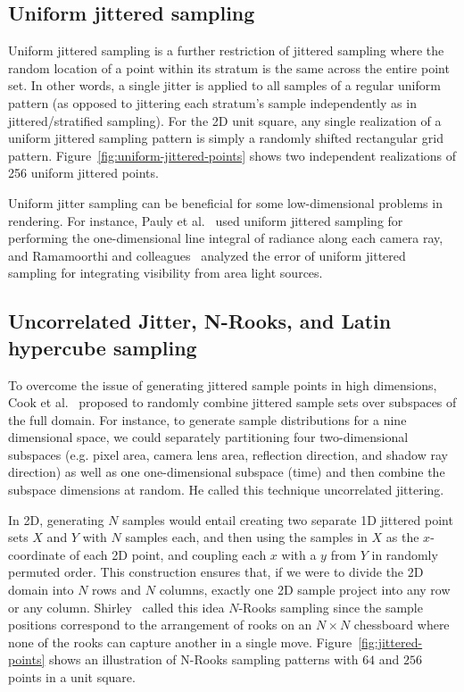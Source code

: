 \documentclass[11pt,fleqn]{book} %
\begin{document}
%

%

\subsection{Uniform jittered sampling}
Uniform jittered sampling is a further restriction of jittered sampling where the random location of a point within its stratum is the same across the entire point set. In other words, a single jitter is applied to all samples of a regular uniform pattern (as opposed to jittering each stratum's sample independently as in jittered/stratified sampling). For the 2D unit square, any single realization of a uniform jittered sampling pattern is simply a randomly shifted rectangular grid pattern. Figure~\ref{fig:uniform-jittered-points} shows two independent realizations of 256 uniform jittered points.

Uniform jitter sampling can be beneficial for some low-dimensional problems in rendering. For instance, Pauly et al.~\cite{pauly00metropolis} used uniform jittered sampling for performing the one-dimensional line integral of radiance along each camera ray, and Ramamoorthi and colleagues~\cite{Ramamoorthi:2012} analyzed the error of uniform jittered sampling for integrating visibility from area light sources.



\subsection{Uncorrelated Jitter, N-Rooks, and Latin hypercube sampling}
%
%
%
To overcome the issue of generating jittered sample points in high dimensions, Cook et al.~\cite{Cook:1984:DRT} proposed to randomly combine jittered sample sets over subspaces of the full domain. For instance, to generate sample distributions for a nine dimensional space, we could separately partitioning four two-dimensional subspaces (e.g. pixel area, camera lens area, reflection direction, and shadow ray direction) as well as one one-dimensional subspace (time) and then combine the subspace dimensions at random. He called this technique uncorrelated jittering.

In 2D, generating $N$ samples would entail creating two separate 1D jittered point sets $X$ and $Y$ with $N$ samples each, and then using the samples in $X$ as the $x$-coordinate of each 2D point, and coupling each $x$ with a $y$ from $Y$ in randomly permuted order. This construction ensures that, if we were to divide the 2D domain into $N$ rows and $N$ columns, exactly one 2D sample project into any row or any column. Shirley~\cite{Shirley91-DQMSD} called this idea $N$-Rooks sampling since the sample positions correspond to the arrangement of rooks on an $N\times N$ chessboard where none of the rooks can capture another in a single move. Figure~\ref{fig:jittered-points} shows an illustration of N-Rooks sampling patterns with $64$ and $256$ points in a unit square.
\end{document}
